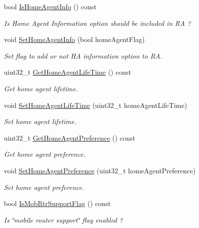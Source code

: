 \begin{DoxyCompactItemize}
bool \hyperlink{classns3_1_1RadvdInterface_a7eaffe373df6e81be67ac0866dbc3c35}{Is\+Home\+Agent\+Info} () const 
\begin{DoxyCompactList}\small\item\em Is Home Agent Information option should be included in RA ? \end{DoxyCompactList}\item 
void \hyperlink{classns3_1_1RadvdInterface_aedb9ad787143b634910362bc0d10dda7}{Set\+Home\+Agent\+Info} (bool home\+Agent\+Flag)
\begin{DoxyCompactList}\small\item\em Set flag to add or not HA information option to RA. \end{DoxyCompactList}\item 
uint32\+\_\+t \hyperlink{classns3_1_1RadvdInterface_ad8ecb2f118a07b0e224f9c2b3307ddbc}{Get\+Home\+Agent\+Life\+Time} () const 
\begin{DoxyCompactList}\small\item\em Get home agent lifetime. \end{DoxyCompactList}\item 
void \hyperlink{classns3_1_1RadvdInterface_af96f98fc844b682a6cdfd46ca9feb4f9}{Set\+Home\+Agent\+Life\+Time} (uint32\+\_\+t home\+Agent\+Life\+Time)
\begin{DoxyCompactList}\small\item\em Set home agent lifetime. \end{DoxyCompactList}\item 
uint32\+\_\+t \hyperlink{classns3_1_1RadvdInterface_a13b9008772a528c61b4e6ee648ff305c}{Get\+Home\+Agent\+Preference} () const 
\begin{DoxyCompactList}\small\item\em Get home agent preference. \end{DoxyCompactList}\item 
void \hyperlink{classns3_1_1RadvdInterface_a845fff380145af1ede72ce909505c5b6}{Set\+Home\+Agent\+Preference} (uint32\+\_\+t home\+Agent\+Preference)
\begin{DoxyCompactList}\small\item\em Set home agent preference. \end{DoxyCompactList}\item 
bool \hyperlink{classns3_1_1RadvdInterface_a60a4eea1cdb941847fd818cd4f6d03af}{Is\+Mob\+Rtr\+Support\+Flag} () const 
\begin{DoxyCompactList}\small\item\em Is \char`\"{}mobile router support\char`\"{} flag enabled ? \end{DoxyCompactList}\item 

\end{DoxyCompactItemize}
